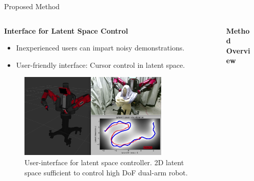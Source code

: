 \documentclass[final,hyperref={pdfpagelabels=false}]{beamer}
\begin{document}
\begin{frame}[t]
    \begin{columns}[t]
        \begin{column}{0.02\linewidth}\end{column}

        \begin{column}{0.96\linewidth}
            \begin{alertblock}{Proposed Method}
                \begin{columns}[t]
                    \begin{column}{0.3\textwidth}
                        \centering \textbf{Interface for Latent Space Control}

                        \begin{itemize}
                            \item Inexperienced users can impart noisy demonstrations. \vspace*{0.5em}
                            \item User-friendly interface: Cursor control in latent space. \vspace*{1em}
                        \end{itemize}

                        \begin{figure}
                            \centering
                            \includegraphics[width=0.8\textwidth]{controller}
                            \vspace*{1em}
                            \caption*{\centering User-interface for latent space controller. 2D latent space sufficient to control high DoF dual-arm robot.}
                        \end{figure}
                    \end{column}

                    \begin{column}{0.4\textwidth}
                        \centering \textbf{Method Overview}


\end{column}
\end{columns}
\end{alertblock}
\end{column}
\end{columns}
\end{frame}
\end{document}
